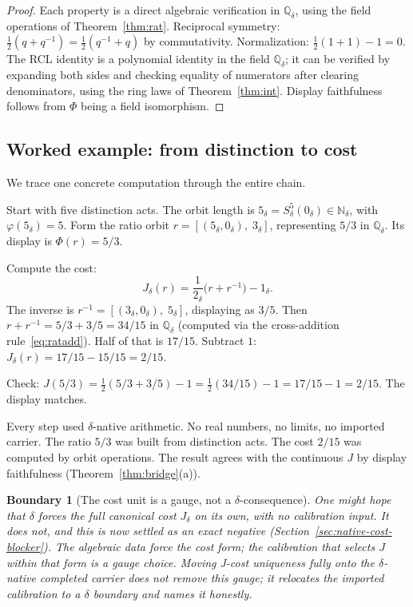 \documentclass[11pt,a4paper]{article}
\newtheorem{boundary}[theorem]{Boundary}
\theoremstyle{definition}
\theoremstyle{remark}
\begin{document}
\begin{proof}
Each property is a direct algebraic verification in $\mathbb{Q}_\delta$,
using the field operations of Theorem~\ref{thm:rat}. Reciprocal symmetry:
$\tfrac{1}{2}(q + q^{-1}) = \tfrac{1}{2}(q^{-1} + q)$ by commutativity.
Normalization: $\tfrac{1}{2}(1 + 1) - 1 = 0$. The RCL identity is a
polynomial identity in the field $\mathbb{Q}_\delta$; it can be verified by
expanding both sides and checking equality of numerators after clearing
denominators, using the ring laws of Theorem~\ref{thm:int}. Display
faithfulness follows from $\Phi$ being a field isomorphism.
\end{proof}

\subsection{Worked example: from distinction to cost}

We trace one concrete computation through the entire chain.

Start with five distinction acts. The orbit length is
$5_\delta = S_\delta^5(0_\delta) \in \mathbb{N}_\delta$, with
$\varphi(5_\delta) = 5$. Form the ratio orbit $r = [(5_\delta, 0_\delta),\;
3_\delta]$, representing $5/3$ in $\mathbb{Q}_\delta$. Its display is
$\Phi(r) = 5/3$.

Compute the cost:
\[
  J_\delta(r) = \frac{1}{2_\delta}\bigl(r + r^{-1}\bigr) - 1_\delta.
\]
The inverse is $r^{-1} = [(3_\delta, 0_\delta),\; 5_\delta]$, displaying as
$3/5$. Then $r + r^{-1} = 5/3 + 3/5 = 34/15$ in $\mathbb{Q}_\delta$
(computed via the cross-addition rule~\eqref{eq:ratadd}). Half of that is
$17/15$. Subtract $1$: $J_\delta(r) = 17/15 - 15/15 = 2/15$.

Check: $J(5/3) = \tfrac{1}{2}(5/3 + 3/5) - 1 = \tfrac{1}{2}(34/15) - 1
= 17/15 - 1 = 2/15$. The display matches.

Every step used $\delta$-native arithmetic. No real numbers, no limits, no
imported carrier. The ratio $5/3$ was built from distinction acts. The cost
$2/15$ was computed by orbit operations. The result agrees with the continuous
$J$ by display faithfulness (Theorem~\ref{thm:bridge}(a)).

\begin{boundary}[The cost unit is a gauge, not a $\delta$-consequence]\label{bnd:cost}
One might hope that $\delta$ forces the full canonical cost $J_\delta$ on its
own, with no calibration input. It does not, and this is now settled as an exact
negative (Section~\ref{sec:native-cost-blocker}). The algebraic data force the
cost \emph{form}; the calibration that selects $J$ within that form is a gauge
choice. Moving J-cost uniqueness fully onto the $\delta$-native completed carrier
does not remove this gauge; it relocates the imported calibration to a $\delta$
boundary and names it honestly.
\end{boundary}
\end{document}

